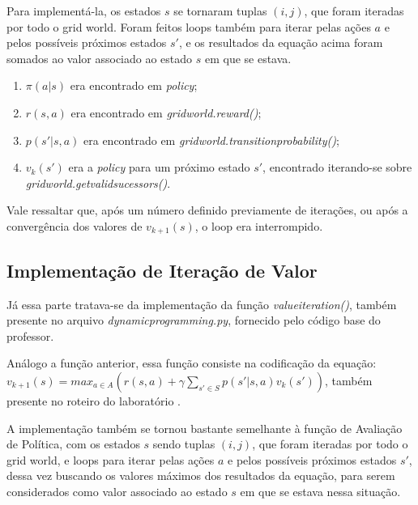 \documentclass[conference]{IEEEtran}
\begin{document}
Para implementá-la, os estados $s$ se tornaram tuplas $(i, j)$, que foram iteradas por todo o grid world. Foram feitos loops também para iterar pelas ações $a$ e pelos possíveis próximos estados $s'$, e os resultados da equação acima foram somados ao valor associado ao estado $s$ em que se estava. 

\begin{enumerate}
\item $\pi \left ( a|s \right )$ era encontrado em \textit{policy};

\item $r \left ( s, a \right )$ era encontrado em \textit{grid\underline{\space}world.reward()};

\item $p \left ( s' | s, a \right )$ era encontrado em \textit{grid\underline{\space}world.transition\underline{\space}probability()};

\item $v_k \left ( s' \right )$ era a \textit{policy} para um próximo estado $s'$, encontrado iterando-se sobre \textit{grid\underline{\space}world.get\underline{\space}valid\underline{\space}sucessors()}.
\end{enumerate}

Vale ressaltar que, após um número definido previamente de iterações, ou após a convergência dos valores de $v_{k+1}(s)$, o loop era interrompido.

\subsection{Implementação de Iteração de Valor}
Já essa parte tratava-se da implementação da função \textit{value\underline{\space}iteration()}, também presente no arquivo \textit{dynamic\underline{\space}programming.py}, fornecido pelo código base do professor.

Análogo a função anterior, essa função consiste na codificação da equação: $v_{k+1}\left ( s \right ) = max_{a \in A} \left (  r \left ( s, a \right ) + \gamma \sum_{s'\in S} p \left ( s' | s, a \right ) v_k \left ( s' \right ) \right )$, também presente no roteiro do laboratório \cite{roteiro}.

A implementação também se tornou bastante semelhante à função de Avaliação de Política, com os estados $s$ sendo tuplas $(i, j)$, que foram iteradas por todo o grid world, e loops para iterar pelas ações $a$ e pelos possíveis próximos estados $s'$, dessa vez buscando os valores máximos dos resultados da equação, para serem considerados como valor associado ao estado $s$ em que se estava nessa situação. 
\end{document}
